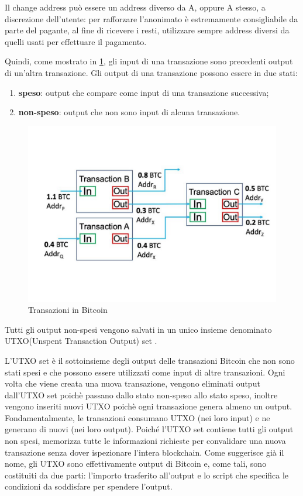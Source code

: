 Il change address può essere un address diverso da A, oppure A stesso, a discrezione dell’utente: per rafforzare l’anonimato è estremamente consigliabile da parte del pagante, al fine di ricevere i resti, utilizzare sempre address diversi da quelli usati per effettuare il pagamento.

Quindi, come mostrato in \ref{fig:transaction}, gli input di una transazione sono precedenti output di un'altra transazione. Gli output di una transazione possono essere in due stati:
\begin{enumerate}
    \item \textbf{speso}: output che compare come input di una transazione successiva;
    \item \textbf{non-speso}: output che non sono input di alcuna transazione.
\end{enumerate}
\begin{figure}[h!]
    \centering
    \includegraphics[scale=0.4, trim = 1cm 2cm 0cm 3cm, clip]{Images/Transactions-input-and-output-in-blockchain.jpg.pdf}
    \caption{Transazioni in Bitcoin}
    \label{fig:transaction}
\end{figure}
\FloatBarrier

Tutti gli output non-spesi vengono salvati in un unico insieme denominato UTXO(Unspent Transaction Output) set \cite{utxo}.

L'UTXO set è il sottoinsieme degli output delle transazioni Bitcoin che non sono stati spesi e che possono essere utilizzati come input di altre transazioni. Ogni volta che viene creata una nuova transazione, vengono eliminati output dall'UTXO set poichè passano dallo stato non-speso allo stato speso, inoltre vengono inseriti nuovi UTXO poichè ogni transazione genera almeno un output. Fondamentalmente, le transazioni consumano UTXO (nei loro input) e ne generano di nuovi (nei loro output). Poiché l'UTXO set contiene tutti gli output non spesi, memorizza tutte le informazioni richieste per convalidare una nuova transazione senza dover ispezionare l'intera blockchain. Come suggerisce già il nome, gli UTXO sono effettivamente output di Bitcoin e, come tali, sono costituiti da due parti: l'importo trasferito all'output e lo script che specifica le condizioni da soddisfare per spendere l'output. 

